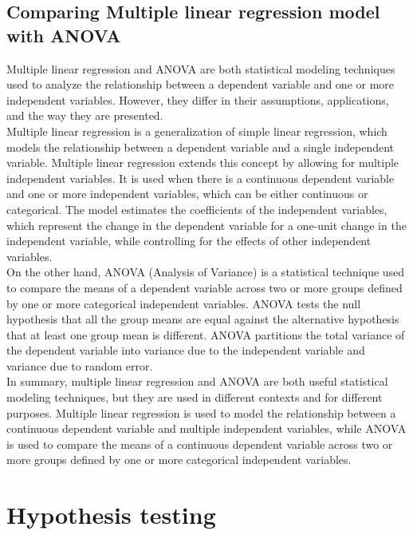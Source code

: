\documentclass[a4paper]{article}
\begin{document}
	\subsection{Comparing Multiple linear regression model with ANOVA}
	Multiple linear regression and ANOVA are both statistical modeling techniques used to analyze the relationship between a dependent variable and one or more independent variables. However, they differ in their assumptions, applications, and the way they are presented.\\
	Multiple linear regression is a generalization of simple linear regression, which models the relationship between a dependent variable and a single independent variable. Multiple linear regression extends this concept by allowing for multiple independent variables. It is used when there is a continuous dependent variable and one or more independent variables, which can be either continuous or categorical. The model estimates the coefficients of the independent variables, which represent the change in the dependent variable for a one-unit change in the independent variable, while controlling for the effects of other independent variables.\\
	On the other hand, ANOVA (Analysis of Variance) is a statistical technique used to compare the means of a dependent variable across two or more groups defined by one or more categorical independent variables. ANOVA tests the null hypothesis that all the group means are equal against the alternative hypothesis that at least one group mean is different. ANOVA partitions the total variance of the dependent variable into variance due to the independent variable and variance due to random error.\\
	In summary, multiple linear regression and ANOVA are both useful statistical modeling techniques, but they are used in different contexts and for different purposes. Multiple linear regression is used to model the relationship between a continuous dependent variable and multiple independent variables, while ANOVA is used to compare the means of a continuous dependent variable across two or more groups defined by one or more categorical independent variables.
	\section{Hypothesis testing}
\end{document}
